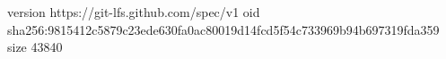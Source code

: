 version https://git-lfs.github.com/spec/v1
oid sha256:9815412c5879c23ede630fa0ac80019d14fcd5f54c733969b94b697319fda359
size 43840
